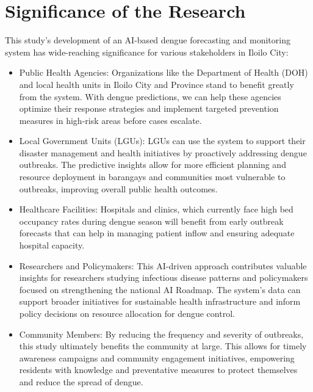 \section{Significance of the Research}
\label{sec:significance}

This study’s development of an AI-based dengue forecasting and monitoring system has wide-reaching significance for various stakeholders in Iloilo City:

\begin{itemize}
\item  Public Health Agencies: Organizations like the Department of Health (DOH) and local health units in Iloilo City and Province stand to benefit greatly from the system. With dengue predictions, we can help these agencies optimize their response strategies and implement targeted prevention measures in high-risk areas before cases escalate.
\end{itemize}

\begin{itemize} 
\item Local Government Units (LGUs): LGUs can use the system to support their disaster management and health initiatives by proactively addressing dengue outbreaks. The predictive insights allow for more efficient planning and resource deployment in barangays and communities most vulnerable to outbreaks, improving overall public health outcomes.
\end{itemize}


\begin{itemize} 
\item Healthcare Facilities: Hospitals and clinics, which currently face high bed occupancy rates during dengue season will benefit from early outbreak forecasts that can help in managing patient inflow and ensuring adequate hospital capacity. 
 \end{itemize}


\begin{itemize} 
\item Researchers and Policymakers: This AI-driven approach contributes valuable insights for researchers studying infectious disease patterns and policymakers focused on strengthening the national AI Roadmap. The system's data can support broader initiatives for sustainable health infrastructure and inform policy decisions on resource allocation for dengue control.
\end{itemize}


\begin{itemize} 
\item Community Members: By reducing the frequency and severity of outbreaks, this study ultimately benefits the community at large. This allows for timely awareness campaigns and community engagement initiatives, empowering residents with knowledge and preventative measures to protect themselves and reduce the spread of dengue.
\end{itemize}

